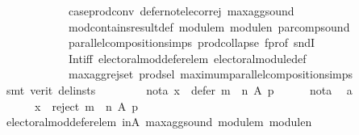 \begin{isabellebody}
\ \ \ \ \ \ \ \ \ \ \ \ case{\isacharunderscore}{\kern0pt}prod{\isacharunderscore}{\kern0pt}conv\ defer{\isacharunderscore}{\kern0pt}not{\isacharunderscore}{\kern0pt}elec{\isacharunderscore}{\kern0pt}or{\isacharunderscore}{\kern0pt}rej\ max{\isacharunderscore}{\kern0pt}agg{\isacharunderscore}{\kern0pt}sound\isanewline
\ \ \ \ \ \ \ \ \ \ \ \ mod{\isacharunderscore}{\kern0pt}contains{\isacharunderscore}{\kern0pt}result{\isacharunderscore}{\kern0pt}def\ module{\isacharunderscore}{\kern0pt}m\ module{\isacharunderscore}{\kern0pt}n\ par{\isacharunderscore}{\kern0pt}comp{\isacharunderscore}{\kern0pt}sound\isanewline
\ \ \ \ \ \ \ \ \ \ \ \ parallel{\isacharunderscore}{\kern0pt}composition{\isachardot}{\kern0pt}simps\ prod{\isachardot}{\kern0pt}collapse\ f{\isacharunderscore}{\kern0pt}prof\ sndI\isanewline
\ \ \ \ \ \ \ \ \ \ \ \ Int{\isacharunderscore}{\kern0pt}iff\ electoral{\isacharunderscore}{\kern0pt}mod{\isacharunderscore}{\kern0pt}defer{\isacharunderscore}{\kern0pt}elem\ electoral{\isacharunderscore}{\kern0pt}module{\isacharunderscore}{\kern0pt}def\isanewline
\ \ \ \ \ \ \ \ \ \ \ \ max{\isacharunderscore}{\kern0pt}agg{\isacharunderscore}{\kern0pt}rej{\isacharunderscore}{\kern0pt}set\ prod{\isachardot}{\kern0pt}sel{\isacharparenleft}{\kern0pt}{}{\isacharparenright}{\kern0pt}\ maximum{\isacharunderscore}{\kern0pt}parallel{\isacharunderscore}{\kern0pt}composition{\isachardot}{\kern0pt}simps\isanewline
\ \ \ \ \ \ \isamarkupfalse%
\ {\isacharparenleft}{\kern0pt}smt\ {\isacharparenleft}{\kern0pt}verit{\isacharcomma}{\kern0pt}\ del{\isacharunderscore}{\kern0pt}insts{\isacharparenright}{\kern0pt}{\isacharparenright}{\kern0pt}\isanewline
\ \ \isamarkupfalse%
\isanewline
\ \ \ \ \isamarkupfalse%
\ not{\isacharunderscore}{\kern0pt}a{}{\isacharcolon}{\kern0pt}\ {\isachardoublequoteopen}x\ {\isasymnotin}\ defer\ {\isacharparenleft}{\kern0pt}m\ {\isasymparallel}\isactrlsub {\isasymup}\ n{\isacharparenright}{\kern0pt}\ A\ p{\isachardoublequoteclose}\isanewline
\ \ \ \ \isamarkupfalse%
\ not{\isacharunderscore}{\kern0pt}a{}\ \isamarkupfalse%
\ a{}{\isacharcolon}{\kern0pt}\isanewline
\ \ \ \ \ \ {\isachardoublequoteopen}x\ {\isasymin}\ reject\ {\isacharparenleft}{\kern0pt}m\ {\isasymparallel}\isactrlsub {\isasymup}\ n{\isacharparenright}{\kern0pt}\ A\ p{\isachardoublequoteclose}\isanewline
\ \ \ \ \ \ \isamarkupfalse%
\ electoral{\isacharunderscore}{\kern0pt}mod{\isacharunderscore}{\kern0pt}defer{\isacharunderscore}{\kern0pt}elem\ in{\isacharunderscore}{\kern0pt}A\ max{\isacharunderscore}{\kern0pt}agg{\isacharunderscore}{\kern0pt}sound\ module{\isacharunderscore}{\kern0pt}m\ module{\isacharunderscore}{\kern0pt}n\isanewline

\end{isabellebody}
